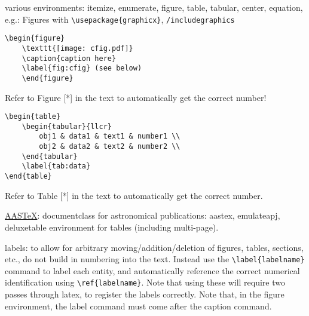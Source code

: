 \documentclass{article}
\begin{document}
various environments: itemize, enumerate, figure, table, tabular,
center, equation, e.g.:
Figures with \verb|\usepackage{graphicx}|, \verb|/includegraphics|
\begin{verbatim}
\begin{figure}
    \texttt{[image: cfig.pdf]}
    \caption{caption here}
    \label{fig:cfig} (see below)
    \end{figure}
\end{verbatim}
Refer to Figure [*] in the text to automatically get the correct
number!
\begin{verbatim}
\begin{table}
    \begin{tabular}{llcr}
        obj1 & data1 & text1 & number1 \\
        obj2 & data2 & text2 & number2 \\
    \end{tabular}
    \label{tab:data}
\end{table}
\end{verbatim}
Refer to Table [*] in the text to automatically get the
correct number.

\href{http://journals.aas.org/authors/aastex.html}{AASTeX}:
documentclass for astronomical publications: aastex, emulateapj,
deluxetable environment for tables (including multi-page).

labels: to allow for arbitrary moving/addition/deletion of figures,
tables, sections, etc., do not build in numbering into the text.
Instead use the \verb|\label{labelname}| command to label each entity, and
automatically reference the correct numerical identification using
\verb|\ref{labelname}|. Note that using these will require two passes through
latex, to register the labels correctly. Note that, in the figure
environment, the label command must come after the caption command.
\end{document}
